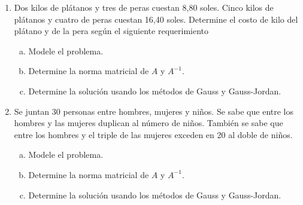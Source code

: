\documentclass[
	spanish,
	8pt,
	utf8,
	xcolor=table,
	handout,
	aspectratio=169,
	professionalfonts,
	notheorems,
	mathserif,
]{beamer}
\newcounter{savedenum}
\newcommand*{\saveenum}{\setcounter{savedenum}{\theenumi}}
\begin{document}
\begin{frame}
\begin{enumerate}
		\item

		      Dos kilos de plátanos y tres de peras cuestan 8,80 soles.
		      Cinco kilos de plátanos y cuatro de peras cuestan 16,40 soles.
		      Determine el costo de kilo del plátano y de la pera según el siguiente requerimiento

		      \begin{multicols}{2}
			      \begin{enumerate}[a)]
				      \item

				            Modele el problema.

				      \item

				            Determine la norma matricial de $A$ y $A^{-1}$.

				      \item

				            Determine la solución usando los métodos de Gauss y
				            Gauss-Jordan.
			      \end{enumerate}
		      \end{multicols}

		\item

		      Se juntan 30 personas entre hombres, mujeres y niños.
		      Se sabe que entre los hombres y las mujeres duplican al
		      número de niños.
		      También se sabe que entre los hombres y el triple de las
		      mujeres exceden en 20 al doble de niños.

		      \begin{multicols}{2}
			      \begin{enumerate}[a)]
				      \item

				            Modele el problema.

				      \item

				            Determine la norma matricial de $A$ y $A^{-1}$.

				      \item


				            Determine la solución usando los métodos de Gauss y Gauss-Jordan.
			      \end{enumerate}
		      \end{multicols}
		      \saveenum
	\end{enumerate}
\end{frame}
\end{document}
